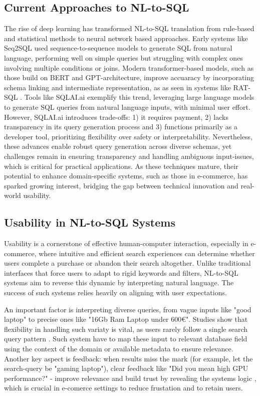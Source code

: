 \documentclass[../../submission.tex]{subfiles}
\begin{document}
\subsection{Current Approaches to NL-to-SQL}
The rise of deep learning has transformed NL-to-SQL translation from 
rule-based and statistical methods to neural network based approaches. Early systems
like Seq2SQL \cite{zhongSeq2SQLGeneratingStructured2017} used sequence-to-sequence models to generate SQL from natural language,
performing well on simple queries but struggling with complex ones involving multiple 
conditions or joins. Modern transformer-based models, such as those build on BERT and GPT-architecture,
improve accuaracy by incorporating schema linking and intermediate representation, as 
as seen in systems like RAT-SQL \cite{wangRATSQLRelationAwareSchema2021}. Tools like SQLAI.ai \cite{GenerateSQLQueries} exemplify this trend, leveraging large language models
to generate SQL queries from natural language inputs, with minimal user effort. However, SQLAI.ai 
introduces trade-offs: 1{)} it requires payment, 2{)} lacks transparency in its query generation process and 3{)}
functions primarily as a developer tool, prioritizing flexibility over safety or interpretability.
Nevertheless, these advances enable robust query generation across diverse 
schemas, yet challenges remain in ensuring transparency and handling ambiguous input-issues, which 
is critical for practical applications. As these techniques mature, their 
potential to enhance domain-specific systems, such as those in e-commerce, has sparked growing interest, bridging
the gap between technical innovation and real-world usability.

\subsection{Usability in NL-to-SQL Systems}
Usability is a cornerstone of effective human-computer interaction, especially 
in e-commerce, where intuitive and efficient search experiences can determine 
whether users complete a purchase or abandon their search altogether. 
Unlike traditional 
interfaces that force users to adapt to rigid keywords and filters, NL-to-SQL systems aim 
to reverse this dynamic by interpreting natural language. The success of such systems relies heavily on aligning with user expectations.

An important factor is interpreting diverse queries, from vague inputs like "good laptop" to precise ones 
like "16Gb Ram Laptop under 600€". Studies show that flexibility in handling such variaty is vital, 
as users rarely follow a single search query pattern \cite{manchandaIntentTermSelection2019}. Such system 
have to map these input to relevant database field using the context of the domain or available metadata
to ensure relevance. Another key aspect is feedback: when results miss the mark (for example, let the search-query 
be "gaming laptop"), clear feedback like "Did you mean high GPU performance?" - improve relevance 
and build trust by revealing the systems logic \cite{popescuEtalTowardsTheoryOfNaturalLanguage}, which is 
crucial in e-comerce settings to reduce frustation and to retain users.
\end{document}
